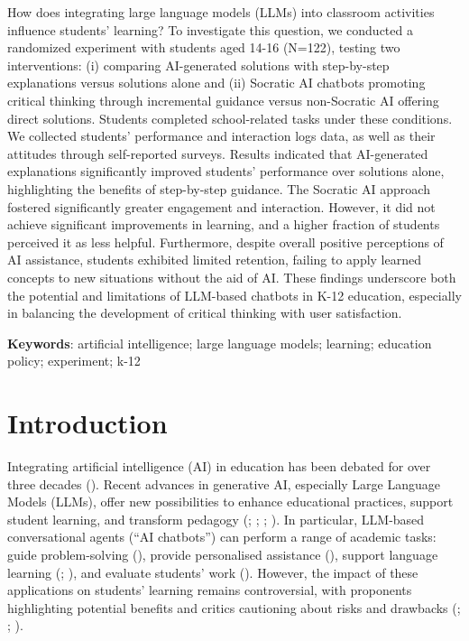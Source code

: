 \documentclass[
  12pt,
]{article}
\begin{document}
How does integrating large language models (LLMs) into classroom activities influence students' learning? To investigate this question, we conducted a randomized experiment with students aged 14-16 (N=122), testing two interventions: (i) comparing AI-generated solutions with step-by-step explanations versus solutions alone and (ii) Socratic AI chatbots promoting critical thinking through incremental guidance versus non-Socratic AI offering direct solutions. Students completed school-related tasks under these conditions. We collected students' performance and interaction logs data, as well as their attitudes through self-reported surveys. Results indicated that AI-generated explanations significantly improved students' performance over solutions alone, highlighting the benefits of step-by-step guidance. The Socratic AI approach fostered significantly greater engagement and interaction. However, it did not achieve significant improvements in learning, and a higher fraction of students perceived it as less helpful. Furthermore, despite overall positive perceptions of AI assistance, students exhibited limited retention, failing to apply learned concepts to new situations without the aid of AI. These findings underscore both the potential and limitations of LLM-based chatbots in K-12 education, especially in balancing the development of critical thinking with user satisfaction.

\textbf{Keywords}: artificial intelligence; large language models; learning; education policy; experiment; k-12

\section{Introduction}\label{introduction}

Integrating artificial intelligence (AI) in education has been debated for over three decades (). Recent advances in generative AI, especially Large Language Models (LLMs), offer new possibilities to enhance educational practices, support student learning, and transform pedagogy (; ; ; ). In particular, LLM-based conversational agents (``AI chatbots'') can perform a range of academic tasks: guide problem-solving (), provide personalised assistance (), support language learning (; ), and evaluate students' work (). However, the impact of these applications on students' learning remains controversial, with proponents highlighting potential benefits and critics cautioning about risks and drawbacks (; ; ).
\end{document}
